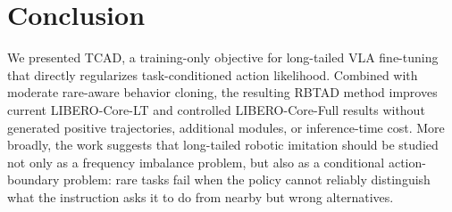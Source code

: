 \section{Conclusion}

We presented TCAD, a training-only objective for long-tailed VLA fine-tuning that directly regularizes task-conditioned action likelihood. Combined with moderate rare-aware behavior cloning, the resulting RBTAD method improves current LIBERO-Core-LT and controlled LIBERO-Core-Full results without generated positive trajectories, additional modules, or inference-time cost. More broadly, the work suggests that long-tailed robotic imitation should be studied not only as a frequency imbalance problem, but also as a conditional action-boundary problem: rare tasks fail when the policy cannot reliably distinguish what the instruction asks it to do from nearby but wrong alternatives.
